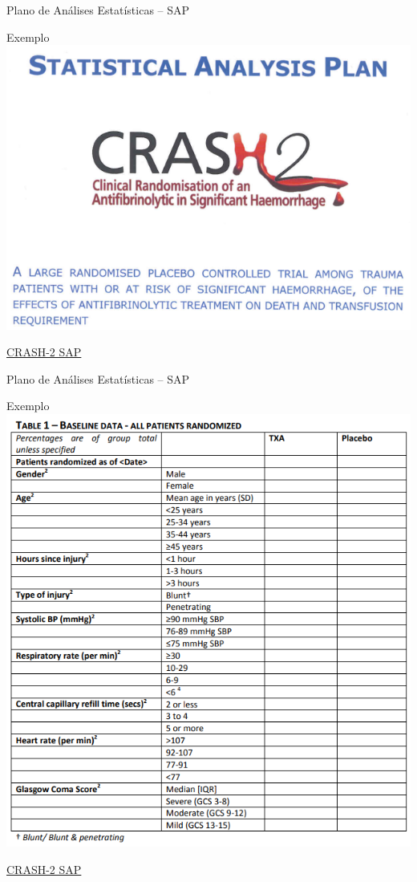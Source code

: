 \documentclass{beamer}
\begin{document}
\begin{frame}{Plano de Análises Estatísticas -- SAP}
  \begin{exampleblock}{Exemplo}
    \centering
    \includegraphics[width=.8\textwidth]{Planejamento/CRASH-SAP}

  \end{exampleblock}
  \vfill
  \scriptsize
  \hfill \href{http://www.crash2.lshtm.ac.uk/Images/SAP.pdf}{CRASH-2 SAP}
\end{frame}

\begin{frame}{Plano de Análises Estatísticas -- SAP}
  \begin{exampleblock}{Exemplo}
    \centering
    \includegraphics[height=.8\textheight]{Planejamento/CRASH-SAP2}

  \end{exampleblock}
  \vfill
  \scriptsize
  \hfill \href{http://www.crash2.lshtm.ac.uk/Images/SAP.pdf}{CRASH-2 SAP}
\end{frame}
\end{document}
